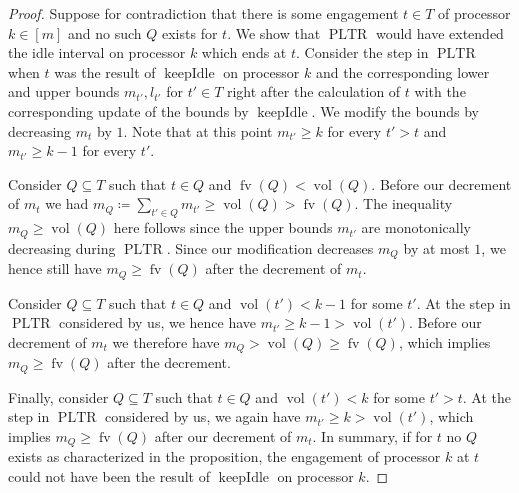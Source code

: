 \documentclass[a4paper]{article}
\DeclareMathOperator{\PLTR}{PLTR}
\DeclareMathOperator{\fv}{fv}
\DeclareMathOperator{\vol}{vol}
\DeclareMathOperator{\keepidle}{keepIdle}
\begin{document}
\begin{proof}
  Suppose for contradiction that there is some engagement $t \in T$ of processor $k \in [m]$ and no such $Q$ exists for $t$.
  We show that $\PLTR$ would have extended the idle interval on processor $k$ which ends at $t$.
  Consider the step in $\PLTR$ when $t$ was the result of $\keepidle$ on processor $k$ and the corresponding lower and upper bounds $m_{t'}, l_{t'}$ for $t' \in T$ right after the calculation of $t$ with the corresponding update of the bounds by $\keepidle$.
  We modify the bounds by decreasing $m_t$ by $1$.
  Note that at this point $m_{t'} \geq k$ for every $t' > t$ and $m_{t'} \geq k - 1$ for every $t'$.

  Consider $Q \subseteq T$ such that $t \in Q$ and $\fv(Q) < \vol(Q)$.
  Before our decrement of $m_t$ we had $m_Q \coloneqq \sum_{t' \in Q} m_{t'} \geq \vol(Q) > \fv(Q)$.
  The inequality $m_Q \geq \vol(Q)$ here follows since the upper bounds $m_{t'}$ are monotonically decreasing during $\PLTR$.
  Since our modification decreases $m_Q$ by at most $1$, we hence still have $m_Q \geq \fv(Q)$ after the decrement of $m_t$.

  Consider $Q \subseteq T$ such that $t \in Q$ and $\vol(t') < k - 1$ for some $t'$.
  At the step in $\PLTR$ considered by us, we hence have $m_{t'} \geq k - 1 > \vol(t')$.
  Before our decrement of $m_t$ we therefore have $m_Q > \vol(Q) \geq \fv(Q)$, which implies $m_Q \geq \fv(Q)$ after the decrement.

  Finally, consider $Q \subseteq T$ such that $t \in Q$ and $\vol(t') < k$ for some $t' > t$.
  At the step in $\PLTR$ considered by us, we again have $m_{t'} \geq k > \vol(t')$, which implies $m_Q \geq \fv(Q)$ after our decrement of $m_t$.
  In summary, if for $t$ no $Q$ exists as characterized in the proposition, the engagement of processor $k$ at $t$ could not have been the result of $\keepidle$ on processor $k$.
\end{proof}
\end{document}
